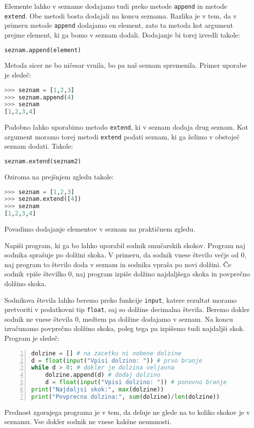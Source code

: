 Elemente lahko v sezname dodajamo tudi preko metode \texttt{append} in metode \texttt{extend}. Obe metodi bosta dodajali na koncu seznama. Razlika je v tem, da v primeru metode \texttt{append} dodajamo en element, zato ta metoda kot argument prejme element, ki ga bomo v seznam dodali. Dodajanje bi torej izvedli takole:
\begin{lstlisting}[language=Python]
seznam.append(element)
\end{lstlisting}
Metoda sicer ne bo ničesar vrnila, bo pa naš seznam spremenila. Primer uporabe je sledeč:
\begin{lstlisting}[language=Python]
>>> seznam = [1,2,3]
>>> seznam.append(4)
>>> seznam
[1,2,3,4]
\end{lstlisting}
Podobno lahko uporabimo metodo \texttt{extend}, ki v seznam dodaja drug seznam. Kot argument moramo torej metodi \texttt{extend} podati seznam, ki ga želimo v obstoječ seznam dodati. Takole:
\begin{lstlisting}[language=Python]
seznam.extend(seznam2)
\end{lstlisting}
Oziroma na prejšnjem zgledu takole:
\begin{lstlisting}[language=Python]
>>> seznam = [1,2,3]
>>> seznam.extend([4])
>>> seznam
[1,2,3,4]
\end{lstlisting}

Povadimo dodajanje elementov v seznam na praktičnem zgledu.
\begin{zgled}
Napiši program, ki ga bo lahko uporabil sodnik smučarskih skokov. Program naj sodnika sprašuje po dolžini skoka. V primeru, da sodnik vnese število večje od 0, naj program to število doda v seznam in sodnika vpraša po novi dolžini. Če sodnik vpiše številko 0, naj program izpiše dolžino najdaljšega skoka in povprečno dolžino skoka.
\end{zgled}
\begin{resitev}
Sodnikova števila lahko beremo preko funkcije \texttt{input}, katere rezultat moramo pretvoriti v podatkovni tip \texttt{float}, saj so dolžine decimalna števila. Beremo dokler sodnik ne vnese števila 0, medtem pa dolžine dodajamo v seznam. Na koncu izračunamo povprečno dolžino skoka, poleg tega pa izpišemo tudi najdaljši skok. Program je sledeč:
\begin{lstlisting}[language=Python,numbers=left]
dolzine = [] # na zacetku ni nobene dolzine
d = float(input("Vpisi dolzino: ")) # prvo branje
while d > 0: # dokler je dolzina veljavna
    dolzine.append(d) # dodaj dolzino
    d = float(input("Vpisi dolzino: ")) # ponovno branje
print("Najdaljsi skok:", max(dolzine))
print("Povprecna dolzina:", sum(dolzine)/len(dolzine))
\end{lstlisting}
\end{resitev}
Prednost zgornjega programa je v tem, da deluje ne glede na to koliko skokov je v seznamu. Vse dokler sodnik ne vnese kakšne neumnosti.


